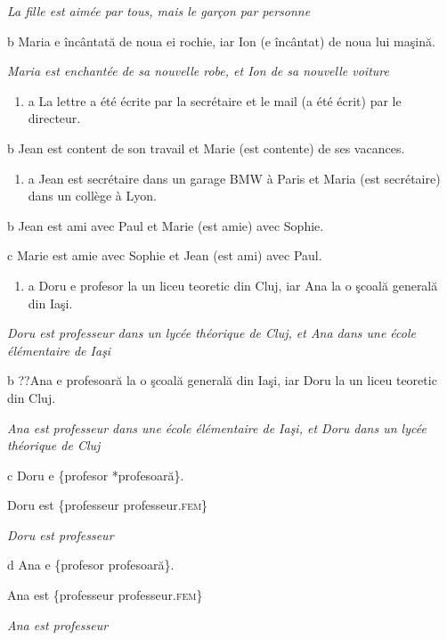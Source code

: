 {\itshape
La fille est aimée par tous, mais le garçon par personne}

  b  Maria e încântată de noua ei rochie, iar Ion (e încântat) de noua lui maşină.

{\itshape
Maria est enchantée de sa nouvelle robe, et Ion de sa nouvelle voiture}


\begin{enumerate}
\item \label{bkm:Ref298175054}a   La lettre a été écrite par la secrétaire et le mail (a été écrit) par le directeur. 


\end{enumerate}
  b  Jean est content de son travail et Marie (est contente) de ses vacances.


\begin{enumerate}
\item \label{bkm:Ref298175121}a   Jean est secrétaire dans un garage BMW à Paris et Maria (est secrétaire) dans un collège à Lyon. 


\end{enumerate}
  b  Jean est ami avec Paul et Marie (est amie) avec Sophie.

  c  Marie est amie avec Sophie et Jean (est ami) avec Paul.


\begin{enumerate}
\item \label{bkm:Ref298175408}a  Doru e profesor la un liceu teoretic din Cluj, iar Ana la o şcoală generală din Iaşi.


\end{enumerate}
{\itshape
Doru est professeur dans un lycée théorique de Cluj, et Ana dans une école élémentaire de Iaşi} 

  b  ??Ana e profesoară la o şcoală generală din Iaşi, iar Doru la un liceu teoretic din Cluj.

{\itshape
Ana est professeur dans une école élémentaire de Iaşi, et Doru dans un lycée théorique de Cluj} 

  c  Doru e \{profesor {\textbar} *profesoară\}.

    Doru est \{professeur {\textbar} professeur\textsc{.fem\}}

{\itshape
Doru est professeur} 

  d  Ana e \{profesor {\textbar} profesoară\}.

    Ana est \{professeur {\textbar} professeur\textsc{.fem\}}

{\itshape
  Ana est professeur} 


